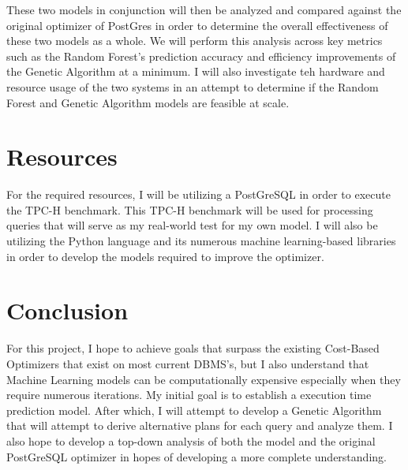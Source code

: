 \documentclass[sigconf]{acmart}
\begin{document}
These two models in conjunction will then be analyzed and compared against the original optimizer of PostGres in order to determine the overall
effectiveness of these two models as a whole. We will perform this analysis across key metrics such as the Random Forest's prediction accuracy and efficiency
improvements of the Genetic Algorithm at a minimum. I will also investigate teh hardware and resource usage of the two systems in an attempt to determine
if the Random Forest and Genetic Algorithm models are feasible at scale.

\section{Resources}
For the required resources, I will be utilizing a PostGreSQL in order to execute the TPC-H benchmark. This TPC-H benchmark will
be used for processing queries that will serve as my real-world test for my own model. I will also be utilizing the Python language and
its numerous machine learning-based libraries in order to develop the models required to improve the optimizer.

\section{Conclusion}
For this project, I hope to achieve goals that surpass the existing Cost-Based Optimizers that exist on most current DBMS's, but
I also understand that Machine Learning models can be computationally expensive especially when they require numerous iterations. My initial goal
is to establish a execution time prediction model. After which, I will attempt to develop a Genetic Algorithm that will attempt to derive alternative
plans for each query and analyze them. I also hope to develop a top-down analysis of both the model and the original PostGreSQL optimizer in hopes
of developing a more complete understanding.




\end{document}
